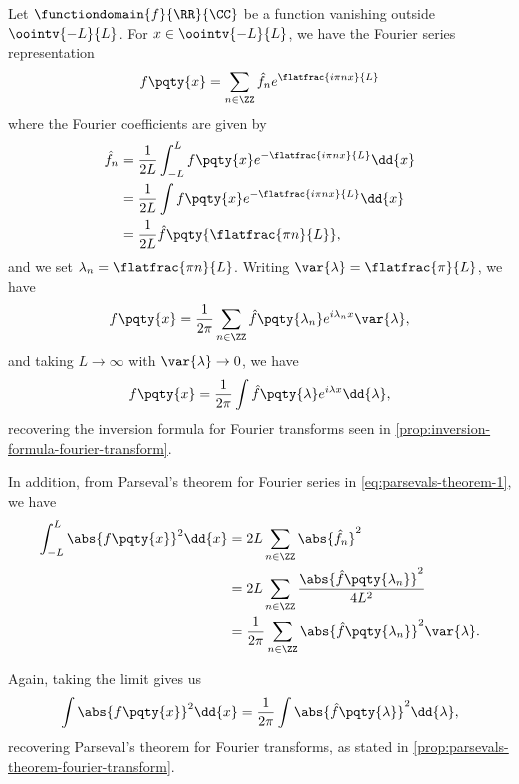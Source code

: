 Let \(\functiondomain{f}{\RR}{\CC}\) be a function vanishing outside \(\oointv{-L}{L}\). For \(x \in \oointv{-L}{L}\), we have the Fourier series representation
\begin{equation}
    f\pqty{x} = \sum_{n \in \ZZ} \hat{f}_n e^{\flatfrac{i \pi n x}{L}}
\end{equation}
where the Fourier coefficients are given by
\begin{subequations}
    \begin{align*}
        \hat{f}_n &= \frac{1}{2L} \int_{-L}^{L} f\pqty{x} e^{- \flatfrac{i \pi n x}{L}} \dd{x} \\
        &= \frac{1}{2L} \int f\pqty{x} e^{- \flatfrac{i \pi n x}{L}} \dd{x} \\
        &= \frac{1}{2L} \hat{f}\pqty{\flatfrac{\pi n}{L}},
    \end{align*}
\end{subequations}
and we set \(\lambda_n = \flatfrac{\pi n}{L}\). Writing \(\var{\lambda} = \flatfrac{\pi}{L}\), we have
\begin{equation}
    f\pqty{x} = \frac{1}{2\pi} \sum_{n \in \ZZ} \hat{f}\pqty{\lambda_n} e^{i \lambda_n x} \var{\lambda},
\end{equation}
and taking \(L \to \infty\) with \(\var{\lambda} \to 0\), we have
\begin{equation}
    f\pqty{x} = \frac{1}{2\pi} \int \hat{f}\pqty{\lambda} e^{i \lambda x} \dd{\lambda},
\end{equation}
recovering the inversion formula for Fourier transforms seen in \autoref{prop:inversion-formula-fourier-transform}.

In addition, from Parseval's theorem for Fourier series in \eqref{eq:parsevals-theorem-1}, we have
\begin{subequations}
    \begin{align}
        \int_{-L}^{L} \abs{f\pqty{x}}^2 \dd{x} &= 2 L \sum_{n \in \ZZ} \abs{\hat{f}_n}^2 \\
        &= 2 L \sum_{n \in \ZZ} \frac{\abs{\hat{f}\pqty{\lambda_n}}^2}{4 L^2} \\
        &= \frac{1}{2 \pi} \sum_{n \in \ZZ} \abs{\hat{f}\pqty{\lambda_n}}^2 \var{\lambda}.
    \end{align}
\end{subequations}

Again, taking the limit gives us
\begin{equation}
    \int \abs{f\pqty{x}}^2 \dd{x} = \frac{1}{2 \pi} \int \abs{\hat{f}\pqty{\lambda}}^2 \dd{\lambda},
\end{equation}
recovering Parseval's theorem for Fourier transforms, as stated in \autoref{prop:parsevals-theorem-fourier-transform}.

